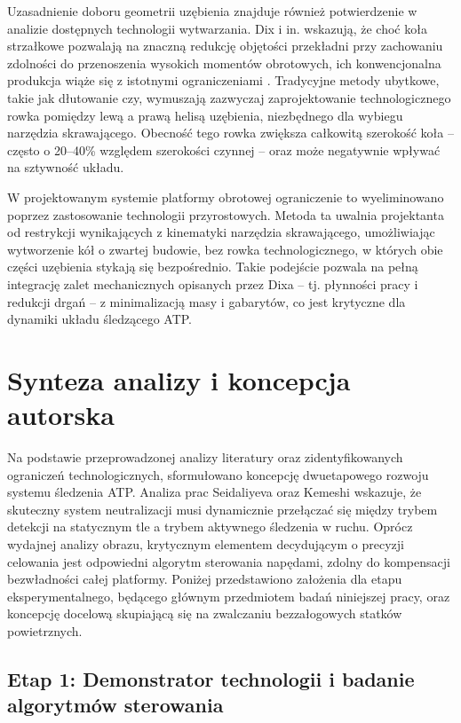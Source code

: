 \documentclass[a4paper,twoside,12pt]{book}
\begin{document}
Uzasadnienie doboru geometrii uzębienia znajduje również potwierdzenie w analizie dostępnych technologii wytwarzania. Dix i in. wskazują, że choć koła strzałkowe pozwalają na znaczną redukcję objętości przekładni przy zachowaniu zdolności do przenoszenia wysokich momentów obrotowych, ich konwencjonalna produkcja wiąże się z istotnymi ograniczeniami \cite{bib:Dix2023}. Tradycyjne metody ubytkowe, takie jak dłutowanie czy, wymuszają zazwyczaj zaprojektowanie technologicznego rowka pomiędzy lewą a prawą helisą uzębienia, niezbędnego dla wybiegu narzędzia skrawającego. Obecność tego rowka zwiększa całkowitą szerokość koła – często o 20--40\% względem szerokości czynnej – oraz może negatywnie wpływać na sztywność układu.

W projektowanym systemie platformy obrotowej ograniczenie to wyeliminowano poprzez zastosowanie technologii przyrostowych. Metoda ta uwalnia projektanta od restrykcji wynikających z kinematyki narzędzia skrawającego, umożliwiając wytworzenie kół o zwartej budowie, bez rowka technologicznego, w których obie części uzębienia stykają się bezpośrednio. Takie podejście pozwala na pełną integrację zalet mechanicznych opisanych przez Dixa – tj. płynności pracy i redukcji drgań – z minimalizacją masy i gabarytów, co jest krytyczne dla dynamiki układu śledzącego ATP.


\section{Synteza analizy i koncepcja autorska}

Na podstawie przeprowadzonej analizy literatury oraz zidentyfikowanych ograniczeń technologicznych, sformułowano koncepcję dwuetapowego rozwoju systemu śledzenia ATP. Analiza prac Seidaliyeva \cite{bib:Seidaliyeva2020} oraz Kemeshi \cite{bib:Kemeshi2024} wskazuje, że skuteczny system neutralizacji musi dynamicznie przełączać się między trybem detekcji na statycznym tle a trybem aktywnego śledzenia w ruchu. Oprócz wydajnej analizy obrazu, krytycznym elementem decydującym o precyzji celowania jest odpowiedni algorytm sterowania napędami, zdolny do kompensacji bezwładności całej platformy. Poniżej przedstawiono założenia dla etapu eksperymentalnego, będącego głównym przedmiotem badań niniejszej pracy, oraz koncepcję docelową skupiającą się na zwalczaniu bezzałogowych statków powietrznych.

\subsection*{Etap 1: Demonstrator technologii i badanie algorytmów sterowania}
\end{document}
